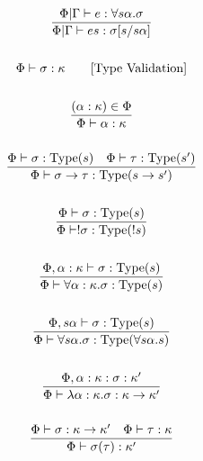 \documentclass {article}
\begin{document}
\begin{gather*}
\frac
{\Phi | \Gamma \vdash e : \forall s \alpha. \sigma}
{\Phi | \Gamma \vdash e s : \sigma [s/s \alpha]} \\
\\
\Phi \vdash \sigma : \kappa \tag* {[\text{Type Validation}]} \\
\\
\frac
{(\alpha : \kappa) \in \Phi}
{\Phi \vdash \alpha : \kappa} \\
\\
\frac
{\Phi \vdash \sigma : \text{Type} (s) \quad \Phi \vdash \tau : \text{Type} (s')}
{\Phi \vdash \sigma \to \tau : \text{Type} (s \to s')} \\
\\
\frac
{\Phi \vdash \sigma : \text{Type} (s)}
{\Phi \vdash !\sigma : \text{Type} (!s)} \\
\\
\frac
{\Phi, \alpha : \kappa \vdash \sigma : \text{Type}(s) }
{\Phi \vdash \forall \alpha : \kappa. \sigma : \text{Type} (s) } \\
\\
\frac
{\Phi, s \alpha \vdash \sigma : \text{Type} (s) }
{\Phi \vdash \forall s \alpha. \sigma : \text{Type} (\forall s \alpha. s) } \\
\\
\frac
{\Phi, \alpha : \kappa : \sigma : \kappa'} 
{\Phi \vdash \lambda \alpha : \kappa. \sigma : \kappa \to \kappa' } \\
\\
\frac
{\Phi \vdash \sigma : \kappa \to \kappa' \quad \Phi \vdash \tau : \kappa}
{\Phi \vdash \sigma (\tau) : \kappa' } \\
\\
\end{gather*}
\end{document}
